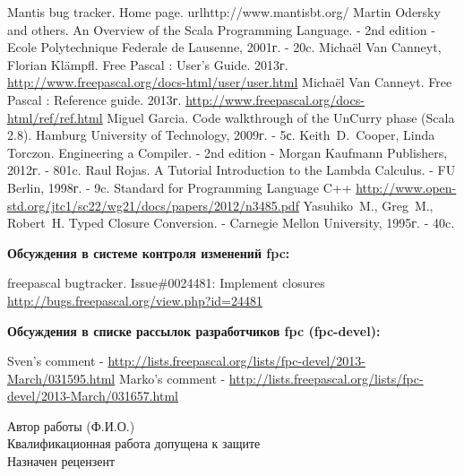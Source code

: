 \documentclass{imcs}
\begin{document}
\begin{thebibliography}{99}
 Mantis bug tracker. Home page. url{http://www.mantisbt.org/}
 Martin Odersky and others. An Overview of the Scala Programming Language. - 2nd edition - Ecole Polytechnique Federale de Lausenne, 2001г. - 20c.
 Michaël Van Canneyt, Florian Klämpfl. Free Pascal : User’s Guide. 2013г. \url{http://www.freepascal.org/docs-html/user/user.html}
 Michaël Van Canneyt. Free Pascal : Reference guide. 2013г. \url{http://www.freepascal.org/docs-html/ref/ref.html}
 Miguel Garcia. Code walkthrough of the UnCurry phase (Scala 2.8). Hamburg University of Technology, 2009г. - 5с.
 Keith~D.~Cooper, Linda Torczon. Engineering a Compiler. - 2nd edition - Morgan Kaufmann Publishers, 2012г. - 801c.
 Raul Rojas. A Tutorial Introduction to the Lambda Calculus. - FU Berlin, 1998г. - 9c.
 Standard for Programming Language C++ \url{http://www.open-std.org/jtc1/sc22/wg21/docs/papers/2012/n3485.pdf}
 Yasuhiko~M., Greg~M., Robert~H. Typed  Closure Conversion. - Carnegie Mellon University, 1995г. - 40c.

  
{\bf Обсуждения в системе контроля изменений fpc:}  
  
 freepascal bugtracker. Issue\#0024481: Implement closures \url{http://bugs.freepascal.org/view.php?id=24481}
  
{\bf Обсуждения в списке рассылок разработчиков fpc (fpc-devel):}

 Sven's comment - \url{http://lists.freepascal.org/lists/fpc-devel/2013-March/031595.html}
 Marko's comment - \url{http://lists.freepascal.org/lists/fpc-devel/2013-March/031657.html}


  
\end{thebibliography}

\pagebreak

\noindent Автор работы  (Ф.И.О.)\\

\noindent{}Квалификационная работа допущена к защите\\

\noindent{}Назначен рецензент\\
\\
\end{document}
